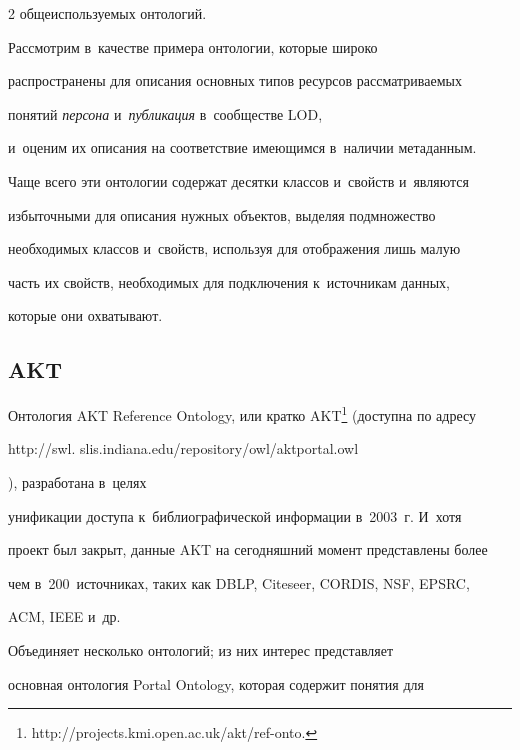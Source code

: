 \begin{multicols}{2}
общеиспользуемых онтологий. 

    

    Рассмотрим в~качестве примера онтологии, ко\-то\-рые широко 

распространены для описания основ\-ных типов ресурсов рассматриваемых 

понятий \textit{персона} и~\textit{пуб\-ли\-ка\-ция} в~сообществе LOD, 

и~оценим их описания на соответствие имеющимся в~наличии метаданным. 

Чаще всего эти онтологии содер\-жат десятки классов и~свойств и~являются 

избыточными для описания нужных объектов, выделяя подмножество 

необходимых классов и~свойств, используя для отображения лишь малую 

часть их свойств, необходимых для подключения к~источникам данных, 

которые они охватывают.



\vspace*{-4pt}

    

     \subsection*{AKT}

     

\vspace*{-2pt}

     

    Онтология AKT Reference Ontology, или кратко AKT\footnote[3]{ {\sf 

http://projects.kmi.open.ac.uk/akt/ref-onto.}} (доступна по адресу {\sf 

http://swl. slis.indiana.edu/repository/owl/aktportal.owl}), разработана в~целях 

унификации доступа к~библиографической информации в~2003~г. И~хотя 

проект был закрыт, данные AKT на сегодняшний момент представлены более 

чем в~200~источниках, таких как DBLP, Citeseer, CORDIS, NSF, EPSRC, 

ACM, IEEE и~др.

    

    Объединяет несколько онтологий; из них интерес представляет 

основная онтология Portal Ontology, которая содержит понятия для 


\end{multicols}
